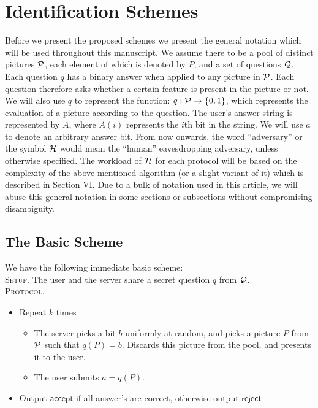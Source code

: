\documentclass{llncs}
\begin{document}
\section{Identification Schemes}
Before we present the proposed schemes we present the general notation which will be used throughout this manuscript. We assume there to be a pool of distinct pictures ${\cal P}$, each element of which is denoted by $P$, and a set of questions ${\cal Q}$. Each question $q$ has a binary answer when applied to any picture in ${\cal P}$. Each question therefore asks whether a certain feature is present in the picture or not. We will also use $q$ to represent the function: $q:{\cal P} \to \left\{ {0,1} \right\}$, which represents the evaluation of a picture according to the question. The user's answer string is represented by $A$, where $A\left( i \right)$ represents the $i$th bit in the string. We will use $a$ to denote an arbitrary answer bit. From now onwards, the word ``adversary'' or the symbol ${\cal H}$ would mean the ``human'' eavesdropping adversary, unless otherwise specified. The workload of ${\cal H}$ for each protocol will be based on the complexity of the above mentioned algorithm (or a slight variant of it) which is described in Section VI. Due to a bulk of notation used in this article, we will abuse this general notation in some sections or subsections without compromising disambiguity.
\subsection{The Basic Scheme}
We have the following immediate basic scheme:\\
\textsc{Setup.} The user and the server share a secret question $q$ from ${\cal Q}$.\\
\textsc{Protocol.}
\begin{itemize}
\item Repeat $k$ times
	\begin{itemize}
	\item The server picks a bit $b$ uniformly at random, and picks a picture $P$ from ${\cal P}$ such that $q\left( P \right) = b$. Discards this picture from the pool, and presents it to the user.
	\item The user submits $a = q\left( P \right)$.
	\end{itemize}
\item Output $\mathsf{accept}$ if all answer's are correct, otherwise output $\mathsf{reject}$
\end{itemize}
\end{document}
